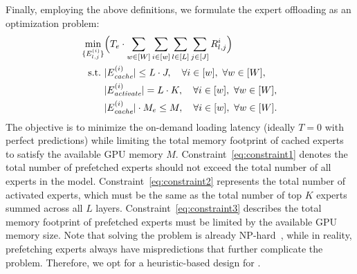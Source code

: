 Finally, employing the above definitions, we formulate the \MoE expert offloading as an \ILP optimization problem: 
\begin{align}
    \min_{\{E^{(i)}_{l, j}\}} &\Big{(} T_e \cdot \sum_{w \in [W]} \sum_{i \in [w]} \sum_{l \in [L]} \sum_{j \in [J]} R^i_{l,j} \Big{)} \notag \\
    \mathrm{s.t.~} 
    & |E^{(i)}_{\textit{cache}}| \leq L \cdot J,\quad \forall i \in [w], ~\forall w \in [W], \label{eq:constraint1} \\
    & |E^{(i)}_{\textit{activate}}| = L \cdot K,\quad \forall i \in [w], ~\forall w \in [W], \label{eq:constraint2} \\
    & |E^{(i)}_{\textit{cache}}| \cdot M_e \leq M,\quad \forall i \in [w], ~\forall w \in [W]. \label{eq:constraint3}
\end{align}
The objective is to minimize the on-demand loading latency (ideally $T = 0$ with perfect predictions) while limiting the total memory footprint of cached experts to satisfy the available GPU memory $M$.
%
Constraint~\ref{eq:constraint1} denotes the total number of prefetched experts should not exceed the total number of all experts in the \MoE model.
Constraint~\ref{eq:constraint2} represents the total number of activated experts, which must be the same as the total number of top $K$ experts summed across all $L$ layers.
Constraint~\ref{eq:constraint3} describes the total memory footprint of prefetched experts must be limited by the available GPU memory size.
%
Note that solving the \ILP problem is already NP-hard~\cite{cormen2022introduction}, while in reality, prefetching experts always have mispredictions that further complicate the problem. Therefore, we opt for a heuristic-based design for \sys.

